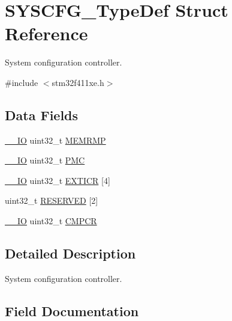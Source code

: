 \hypertarget{struct_s_y_s_c_f_g___type_def}{}\section{S\+Y\+S\+C\+F\+G\+\_\+\+Type\+Def Struct Reference}
\label{struct_s_y_s_c_f_g___type_def}


System configuration controller.  




{\ttfamily \#include $<$stm32f411xe.\+h$>$}

\subsection*{Data Fields}
\begin{DoxyCompactItemize}
\item 
\hyperlink{core__sc300_8h_aec43007d9998a0a0e01faede4133d6be}{\+\_\+\+\_\+\+IO} uint32\+\_\+t \hyperlink{struct_s_y_s_c_f_g___type_def_a85b9d3df2274b730327b181c402a7bf5}{M\+E\+M\+R\+MP}
\item 
\hyperlink{core__sc300_8h_aec43007d9998a0a0e01faede4133d6be}{\+\_\+\+\_\+\+IO} uint32\+\_\+t \hyperlink{struct_s_y_s_c_f_g___type_def_ab5c47c570566cb8ff9d0436c17cc9241}{P\+MC}
\item 
\hyperlink{core__sc300_8h_aec43007d9998a0a0e01faede4133d6be}{\+\_\+\+\_\+\+IO} uint32\+\_\+t \hyperlink{struct_s_y_s_c_f_g___type_def_a66a06b3aab7ff5c8fa342f7c1994bf7d}{E\+X\+T\+I\+CR} \mbox{[}4\mbox{]}
\item 
uint32\+\_\+t \hyperlink{struct_s_y_s_c_f_g___type_def_a43926e6d31a976a0018b2d1f5c92645d}{R\+E\+S\+E\+R\+V\+ED} \mbox{[}2\mbox{]}
\item 
\hyperlink{core__sc300_8h_aec43007d9998a0a0e01faede4133d6be}{\+\_\+\+\_\+\+IO} uint32\+\_\+t \hyperlink{struct_s_y_s_c_f_g___type_def_ada13497abc6402300570ff5f430a612e}{C\+M\+P\+CR}
\end{DoxyCompactItemize}


\subsection{Detailed Description}
System configuration controller. 

\subsection{Field Documentation}
\mbox{\label{struct_s_y_s_c_f_g___type_def_ada13497abc6402300570ff5f430a612e}} 
